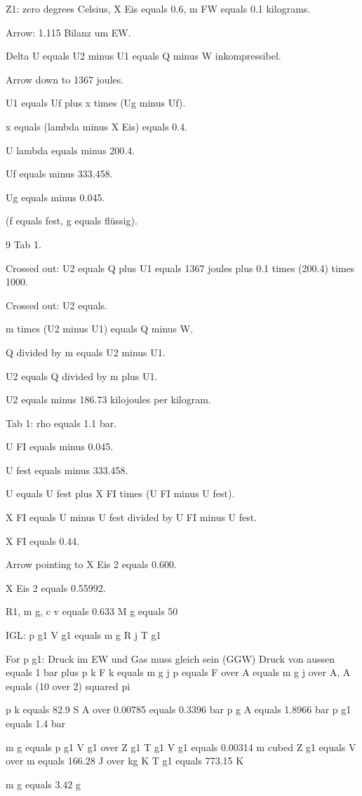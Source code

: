 Z1: zero degrees Celsius, X Eis equals 0.6, m FW equals 0.1 kilograms.

Arrow: 1.115 Bilanz um EW.

Delta U equals U2 minus U1 equals Q minus W inkompressibel.

Arrow down to 1367 joules.

U1 equals Uf plus x times (Ug minus Uf).

x equals (lambda minus X Eis) equals 0.4.

U lambda equals minus 200.4.

Uf equals minus 333.458.

Ug equals minus 0.045.

(f equals fest, g equals flüssig).

9 Tab 1.

Crossed out: U2 equals Q plus U1 equals 1367 joules plus 0.1 times (200.4) times 1000.

Crossed out: U2 equals.

m times (U2 minus U1) equals Q minus W.

Q divided by m equals U2 minus U1.

U2 equals Q divided by m plus U1.

U2 equals minus 186.73 kilojoules per kilogram.

Tab 1: rho equals 1.1 bar.

U FI equals minus 0.045.

U fest equals minus 333.458.

U equals U fest plus X FI times (U FI minus U fest).

X FI equals U minus U fest divided by U FI minus U fest.

X FI equals 0.44.

Arrow pointing to X Eis 2 equals 0.600.

X Eis 2 equals 0.55992.

R1, m g, c v equals 0.633  
M g equals 50  

IGL: p g1 V g1 equals m g R j T g1  

For p g1: Druck im EW und Gas muss gleich sein (GGW)  
Druck von aussen equals 1 bar plus p k  
F k equals m g j p equals F over A equals m g j over A, A equals (10 over 2) squared pi  

p k equals 82.9 S A over 0.00785 equals 0.3396 bar  
p g A equals 1.8966 bar  
p g1 equals 1.4 bar  

m g equals p g1 V g1 over Z g1 T g1  
V g1 equals 0.00314 m cubed  
Z g1 equals V over m equals 166.28 J over kg K  
T g1 equals 773.15 K  

m g equals 3.42 g